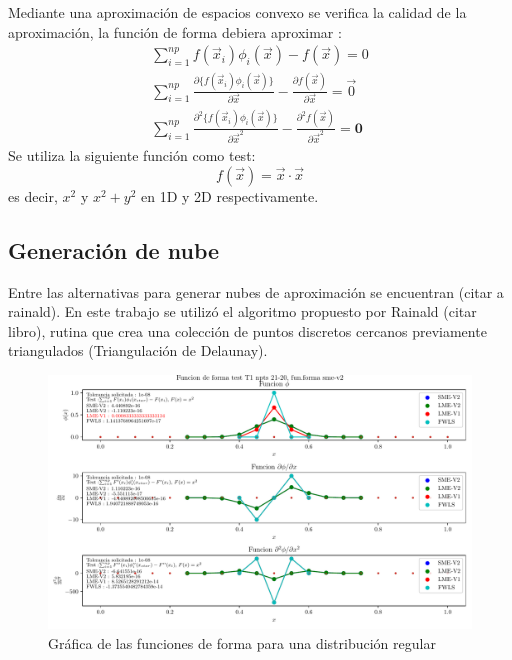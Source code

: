 Mediante una aproximación de espacios convexo se verifica la calidad de la aproximación, la función de forma debiera aproximar :
\begin{eqnarray}
    \sum_{i=1}^{np} f(\vec{x}_i) \phi_i(\vec{x}) - f(\vec{x}) = 0 \\
    \sum_{i=1}^{np} \frac{\partial\{f(\vec{x}_i)\phi_i(\vec{x})\}}{\partial \vec{x}} - \frac{\partial f(\vec{x})}{\partial \vec{x}} = \vec{0} \\
    \sum_{i=1}^{np} \frac{\partial^2\{f(\vec{x}_i)\phi_i(\vec{x})\}}{\partial \vec{x}^2} - \frac{\partial^2 f(\vec{x})}{\partial \vec{x}^2} = \textbf{0}
\end{eqnarray}
Se utiliza la siguiente función como test:
\begin{equation}
    f(\vec{x}) = \vec{x} \cdot \vec{x}
\end{equation}
es decir, $x^2$ y $x^2+y^2$ en 1D y 2D respectivamente.


\subsection{Generación de nube}
Entre las alternativas para generar nubes de aproximación se encuentran (citar a rainald). En este trabajo se utilizó el algoritmo propuesto por Rainald (citar libro), rutina que crea una colección de puntos discretos cercanos previamente triangulados (Triangulación de Delaunay).


\begin{figure}
    \centering
    \includegraphics[width=1\textwidth]{./Imagenes/05/T1_21-20_regular_type-2_direct_10.pdf}
    \caption{Gráfica de las funciones de forma para una distribución regular} \label{fig:multiple_sf}
\end{figure}

